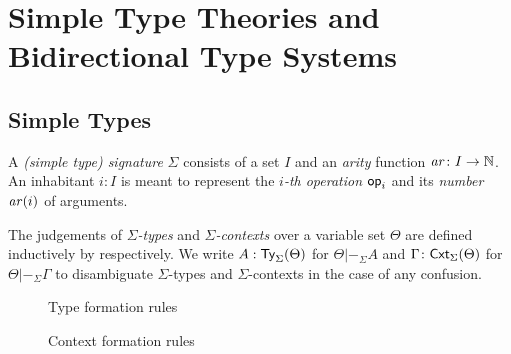 
\section{Simple Type Theories and Bidirectional Type Systems}\label{sec:defs}

\subsection{Simple Types}
\begin{definition}
  A \emph{(simple type) signature} $\Sigma$ consists of a set $I$ and an \emph{arity} function $\mathit{ar}\colon I \to \mathbb{N}$.
  An inhabitant $i : I$ is meant to represent the \emph{$i$-th operation} $\mathsf{op}_i$ and its \emph{number} $ \mathit{ar}(i)$ of arguments.

  The judgements of \emph{$\Sigma$-types} and \emph{$\Sigma$-contexts} over a variable set $\Theta$ are defined inductively by  respectively.
We write $A : \mathsf{Ty}_{\Sigma}(\Theta)$ for $\Theta |-_{\Sigma} A$ and $\Gamma \colon \mathsf{Cxt}_{\Sigma}(\Theta)$ for $\Theta |-_{\Sigma} \Gamma$ to disambiguate $\Sigma$-types and $\Sigma$-contexts in the case of any confusion.
\end{definition}

\begin{figure}
  \begin{minipage}[b]{.55\textwidth}
    \centering
    \small
    \caption{Type formation rules}
    \label{fig:simple-type}
  \end{minipage}
  \begin{minipage}[b]{.4\textwidth}
    \centering
    \small
    \judgbox{\Theta |-_{\Sigma} \Gamma}{}
    \caption{Context formation rules}
  \label{fig:simple-context}
  \end{minipage}
\end{figure}

